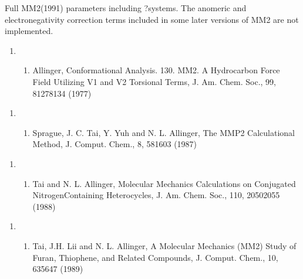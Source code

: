 \documentclass[letterpaper,11pt,english]{sphinxmanual}
\begin{document}
Full MM2(1991) parameters including ?\sphinxhyphen{}systems. The anomeric and electronegativity correction terms included in some later versions of MM2 are not implemented.
\begin{enumerate}
%
\setcounter{enumi}{13}
\item {} \begin{enumerate}
%
\setcounter{enumii}{11}
\item {} 
Allinger, Conformational Analysis. 130. MM2. A Hydrocarbon Force Field Utilizing V1 and V2 Torsional Terms, J. Am. Chem. Soc., 99, 8127\sphinxhyphen{}8134 (1977)

\end{enumerate}

\end{enumerate}
\begin{enumerate}
%
\setcounter{enumi}{9}
\item {} \begin{enumerate}
%
\setcounter{enumii}{19}
\item {} 
Sprague, J. C. Tai, Y. Yuh and N. L. Allinger, The MMP2 Calculational Method, J. Comput. Chem., 8, 581\sphinxhyphen{}603 (1987)

\end{enumerate}

\end{enumerate}
\begin{enumerate}
%
\setcounter{enumi}{9}
\item {} \begin{enumerate}
%
\setcounter{enumii}{2}
\item {} 
Tai and N. L. Allinger, Molecular Mechanics Calculations on Conjugated Nitrogen\sphinxhyphen{}Containing Heterocycles, J. Am. Chem. Soc., 110, 2050\sphinxhyphen{}2055 (1988)

\end{enumerate}

\end{enumerate}
\begin{enumerate}
%
\setcounter{enumi}{9}
\item {} \begin{enumerate}
%
\setcounter{enumii}{2}
\item {} 
Tai, J.\sphinxhyphen{}H. Lii and N. L. Allinger, A Molecular Mechanics (MM2) Study of Furan, Thiophene, and Related Compounds, J. Comput. Chem., 10, 635\sphinxhyphen{}647 (1989)

\end{enumerate}

\end{enumerate}
\end{document}
